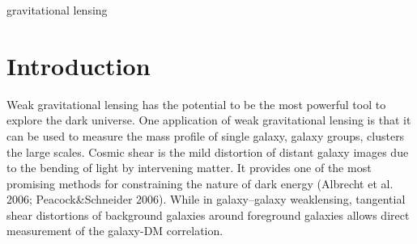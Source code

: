 \documentclass[useAMS,usenatbib]{mn2e}
\begin{document}
\begin{keywords}
  gravitational lensing
\end{keywords}

\setcounter{footnote}{1}




\section{Introduction}

\label{sec:intro}










Weak gravitational lensing has the potential to be the most powerful
tool to explore the dark universe. One application of weak gravitational lensing is
that it can be used to measure the mass profile of single galaxy, galaxy
groups, clusters  the large scales. Cosmic shear is the mild distortion
of distant galaxy images due to the bending of light by intervening
matter. It provides one of the most promising methods for constraining
the nature of dark energy (Albrecht et al. 2006; Peacock\&Schneider
2006). While in galaxy--galaxy weaklensing, tangential shear distortions
of background galaxies around foreground galaxies allows direct measurement
of the galaxy-DM correlation.
\end{document}
